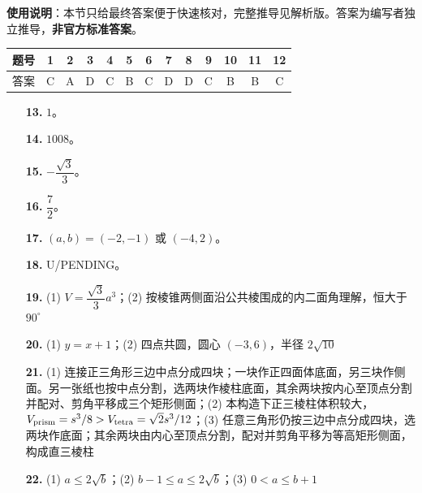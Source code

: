 
\begin{gknotice}
\textbf{使用说明}：本节只给最终答案便于快速核对，完整推导见解析版。答案为编写者独立推导，\textbf{非官方标准答案}。
\end{gknotice}

\begin{center}\begin{tabular}{ccccccccccccc}
\toprule
题号 & 1 & 2 & 3 & 4 & 5 & 6 & 7 & 8 & 9 & 10 & 11 & 12 \\
\midrule
答案 & C & A & D & C & B & C & D & D & C & B & B & C \\
\bottomrule
\end{tabular}\end{center}

\begin{itemize}[leftmargin=2.6em]
  \item[\textbf{13.}] $1$。
  \item[\textbf{14.}] $1008$。
  \item[\textbf{15.}] $-\dfrac{\sqrt3}{3}$。
  \item[\textbf{16.}] $\dfrac72$。
\end{itemize}

\begin{itemize}[leftmargin=2.6em]
  \item[\textbf{17.}] $(a,b)=(-2,-1)$ 或 $(-4,2)$。
  \item[\textbf{18.}] U/PENDING。
  \item[\textbf{19.}] (1) $V=\dfrac{\sqrt3}{3}a^3$；(2) 按棱锥两侧面沿公共棱围成的内二面角理解，恒大于 $90^\circ$
  \item[\textbf{20.}] (1) $y=x+1$；(2) 四点共圆，圆心 $(-3,6)$，半径 $2\sqrt{10}$
  \item[\textbf{21.}] (1) 连接正三角形三边中点分成四块；一块作正四面体底面，另三块作侧面。另一张纸也按中点分割，选两块作棱柱底面，其余两块按内心至顶点分割并配对、剪角平移成三个矩形侧面；(2) 本构造下正三棱柱体积较大，$V_{\rm prism}=s^3/8>V_{\rm tetra}=\sqrt2s^3/12$；(3) 任意三角形仍按三边中点分成四块，选两块作底面；其余两块由内心至顶点分割，配对并剪角平移为等高矩形侧面，构成直三棱柱
  \item[\textbf{22.}] (1) $a\leqslant2\sqrt b$；(2) $b-1\leqslant a\leqslant2\sqrt b$；(3) $0<a\leqslant b+1$
\end{itemize}
